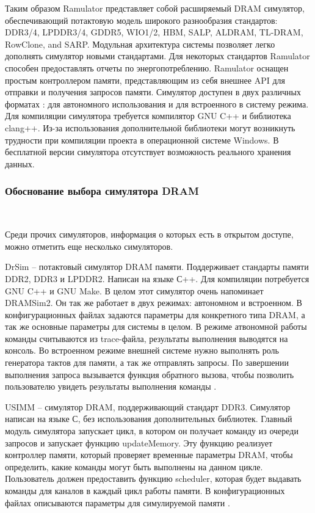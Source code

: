 Таким образом Ramulator представляет собой расширяемый DRAM симулятор, обеспечивающий потактовую модель широкого разнообразия стандартов: DDR3/4, LPDDR3/4, GDDR5, WIO1/2, HBM, SALP, ALDRAM, TL-DRAM, RowClone, and SARP. Модульная архитектура системы позволяет легко дополнять симулятор новыми стандартами. Для некоторых стандартов Ramulator способен предоставлять отчеты по энергопотреблению. Ramulator оснащен простым контроллером памяти, представляющим из себя внешнее API для отправки и получения запросов памяти. Симулятор доступен в двух различных форматах : для автономного использования и для встроенного в систему режима. Для компиляции симулятора требуется компилятор GNU C++ и библиотека clang++. Из-за использования дополнительной библиотеки могут возникнуть трудности при компиляции проекта в операционной системе Windows. В бесплатной версии симулятора отсутствует возможность реального хранения данных.

\subsubsection{Обоснование выбора симулятора DRAM}~\\
\label{sub:domain:simulators:simulator_choice}

Среди прочих симуляторов, информация о которых есть в открытом доступе, можно отметить еще несколько симуляторов. 

DrSim – потактовый симулятор DRAM памяти. Поддерживает стандарты памяти DDR2, DDR3 и LPDDR2. Написан на языке С++. Для компиляции потребуется GNU C++ и GNU Make. В целом этот симулятор очень напоминает DRAMSim2. Он так же работает в двух режимах: автономном и встроенном. В конфигурационных файлах задаются параметры для конкретного типа DRAM, а так же основные параметры для системы в целом. В режиме атвономной работы команды считываются из trace-файла, результаты выполнения выводятся на консоль. Во встроенном режиме внешней системе нужно выполнять роль генератора тактов для памяти, а так же отправлять запросы. По завершении выполнения запроса вызывается функция обратного вызова, чтобы позволить пользователю увидеть результаты выполнения команды \cite{drsim_manual}.

USIMM – симулятор DRAM, поддерживающий стандарт DDR3. Симулятор написан на языке С, без использования дополнительных библиотек. Главный модуль симулятора запускает цикл, в котором он получает команду из очереди запросов и запускает функцию updateMemory. Эту функцию реализует контроллер памяти, который проверяет временные параметры DRAM, чтобы определить, какие команды могут быть выполнены на данном цикле. Пользователь должен предоставить функцию scheduler, которая будет выдавать команды для каналов в каждый цикл работы памяти. В конфигурационных файлах описываются параметры для симулируемой памяти \cite{usimm_manual}. 

